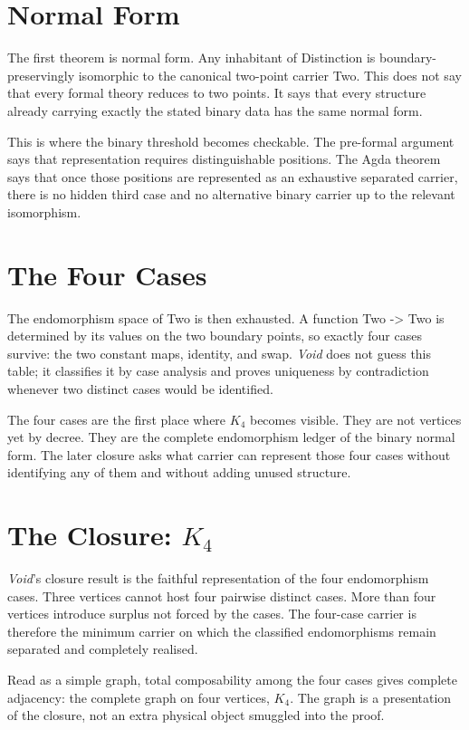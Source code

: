 \documentclass[11pt,a4paper]{book}
\def\texttt#1{#1}%
\begin{document}
\section*{Normal Form}

The first theorem is normal form. Any inhabitant of \texttt{Distinction} is boundary-preservingly isomorphic to the canonical two-point carrier \texttt{Two}. This does not say that every formal theory reduces to two points. It says that every structure already carrying exactly the stated binary data has the same normal form.

This is where the binary threshold becomes checkable. The pre-formal argument says that representation requires distinguishable positions. The Agda theorem says that once those positions are represented as an exhaustive separated carrier, there is no hidden third case and no alternative binary carrier up to the relevant isomorphism.

\section*{The Four Cases}

The endomorphism space of \texttt{Two} is then exhausted. A function \texttt{Two -> Two} is determined by its values on the two boundary points, so exactly four cases survive: the two constant maps, identity, and swap. \textit{Void} does not guess this table; it classifies it by case analysis and proves uniqueness by contradiction whenever two distinct cases would be identified.

The four cases are the first place where $K_4$ becomes visible. They are not vertices yet by decree. They are the complete endomorphism ledger of the binary normal form. The later closure asks what carrier can represent those four cases without identifying any of them and without adding unused structure.

\section*{The Closure: $K_4$}

\textit{Void}'s closure result is the faithful representation of the four endomorphism cases. Three vertices cannot host four pairwise distinct cases. More than four vertices introduce surplus not forced by the cases. The four-case carrier is therefore the minimum carrier on which the classified endomorphisms remain separated and completely realised.

Read as a simple graph, total composability among the four cases gives complete adjacency: the complete graph on four vertices, $K_4$. The graph is a presentation of the closure, not an extra physical object smuggled into the proof.
\end{document}

